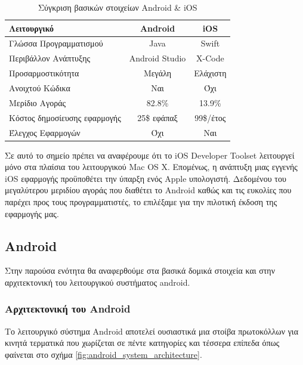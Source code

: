 	\begin{table}[H]
		\begin{center}
			\begin{tabular}{|l|c|c|}
			\hline
			\rowcolor{grayy}
			\textbf{Λειτουργικό} & \textbf{Android} & \textbf{iOS}
			\\ \hline
			Γλώσσα Προγραμματισμού & Java & Swift \\ \hline
			Περιβάλλον Ανάπτυξης & Android Studio & X-Code  \\ \hline
			Προσαρμοστικότητα & Μεγάλη & Ελάχιστη  \\ \hline
			Ανοιχτού Κώδικα & Ναι & Όχι  \\ \hline
			Μερίδιο Αγοράς & 82.8\% & 13.9\% \\ \hline
			Κόστος δημοσίευσης εφαρμογής & 25\$ εφάπαξ & 99\$/έτος  \\ \hline
			Έλεγχος Εφαρμογών & Όχι & Ναι \\ \hline
			\end{tabular}
			\caption{Σύγκριση βασικών στοιχείων Android \& iOS}
			\label{tab:android_vs_ios}
		\end{center}
	\end{table}
	Σε αυτό το σημείο πρέπει να αναφέρουμε ότι το iOS Developer Toolset λειτουργεί μόνο στα πλαίσια του λειτουργικού Mac OS X. Επομένως, η ανάπτυξη μιας εγγενής iOS εφαρμογής προϋποθέτει την ύπαρξη ενός Apple υπολογιστή. Δεδομένου του μεγαλύτερου μεριδίου αγοράς που διαθέτει το Android καθώς και τις ευκολίες που παρέχει προς τους προγραμματιστές, το επιλέξαμε για την πιλοτική έκδοση της εφαρμογής μας.
	
	
	\subsection{Android}
	Στην παρούσα ενότητα θα αναφερθούμε στα βασικά δομικά στοιχεία και στην αρχιτεκτονική του λειτουργικού συστήματος android.
	
		\subsubsection{Αρχιτεκτονική του Android}
		Το λειτουργικό σύστημα Android αποτελεί ουσιαστικά μια στοίβα πρωτοκόλλων για κινητά τερματικά που χωρίζεται σε πέντε κατηγορίες και τέσσερα επίπεδα όπως φαίνεται στο σχήμα \ref{fig:android_system_architecture}.
		
